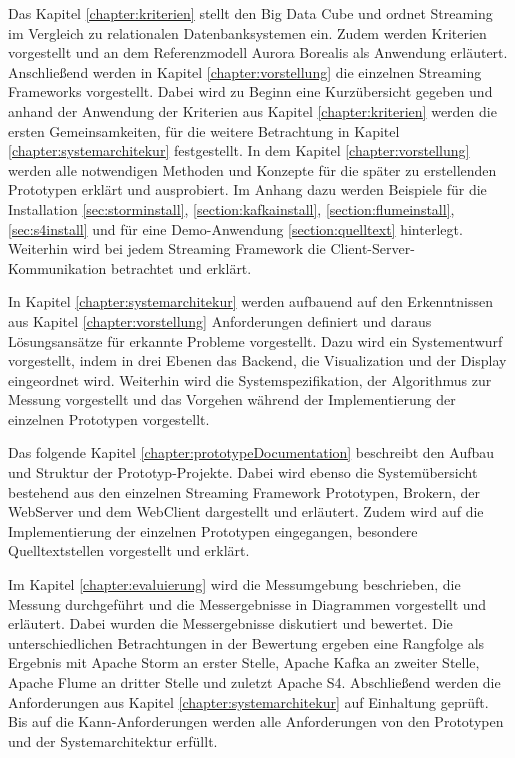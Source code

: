 Das Kapitel \ref{chapter:kriterien} stellt den Big Data Cube und ordnet Streaming im Vergleich zu relationalen Datenbanksystemen ein. Zudem werden Kriterien vorgestellt und an dem Referenzmodell Aurora Borealis als Anwendung erläutert. Anschließend werden in Kapitel \ref{chapter:vorstellung} die einzelnen Streaming Frameworks vorgestellt. Dabei wird zu Beginn eine Kurzübersicht gegeben und anhand der Anwendung der Kriterien aus Kapitel \ref{chapter:kriterien} werden die ersten Gemeinsamkeiten, für die weitere Betrachtung in Kapitel \ref{chapter:systemarchitekur} festgestellt. In dem Kapitel \ref{chapter:vorstellung} werden alle notwendigen Methoden und Konzepte für die später zu erstellenden Prototypen erklärt und ausprobiert. Im Anhang dazu werden Beispiele für die Installation \ref{sec:storminstall}, \ref{section:kafkainstall}, \ref{section:flumeinstall}, \ref{sec:s4install} und für eine Demo-Anwendung \ref{section:quelltext} hinterlegt. Weiterhin wird bei jedem Streaming Framework die Client-Server-Kommunikation betrachtet und erklärt.

In Kapitel \ref{chapter:systemarchitekur} werden aufbauend auf den Erkenntnissen aus Kapitel \ref{chapter:vorstellung} Anforderungen definiert und daraus Lösungsansätze für erkannte Probleme vorgestellt. Dazu wird ein Systementwurf vorgestellt, indem in drei Ebenen das Backend, die Visualization und der Display eingeordnet wird. Weiterhin wird die Systemspezifikation, der Algorithmus zur Messung vorgestellt und das Vorgehen während der Implementierung der einzelnen Prototypen vorgestellt.

Das folgende Kapitel \ref{chapter:prototypeDocumentation} beschreibt den Aufbau und Struktur der Prototyp-Projekte. Dabei wird ebenso die Systemübersicht bestehend aus den einzelnen Streaming Framework Prototypen, Brokern, der WebServer und dem WebClient dargestellt und erläutert. Zudem wird auf die Implementierung der einzelnen Prototypen eingegangen, besondere Quelltextstellen vorgestellt und erklärt.

Im Kapitel \ref{chapter:evaluierung} wird die Messumgebung beschrieben, die Messung durchgeführt und die Messergebnisse in Diagrammen vorgestellt und erläutert. Dabei wurden die Messergebnisse diskutiert und bewertet. Die unterschiedlichen Betrachtungen in der Bewertung ergeben eine Rangfolge als Ergebnis mit Apache Storm an erster Stelle, Apache Kafka an zweiter Stelle, Apache Flume an dritter Stelle und zuletzt Apache S4. Abschließend werden die Anforderungen aus Kapitel \ref{chapter:systemarchitekur} auf Einhaltung geprüft. Bis auf die Kann-Anforderungen werden alle Anforderungen von den Prototypen und der Systemarchitektur erfüllt.

